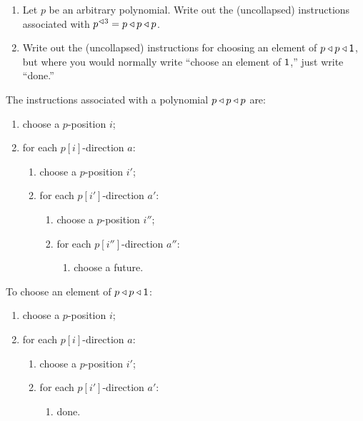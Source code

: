 \documentclass[Book-Poly]{subfiles}
\begin{document}
\begin{exercise}
\begin{enumerate}
	\item Let $p$ be an arbitrary polynomial. Write out the (uncollapsed) instructions associated with $p^{\lhd 3}=p\mathbin{\triangleleft} p\mathbin{\triangleleft} p$.
	\item Write out the (uncollapsed) instructions for choosing an element of $p\mathbin{\triangleleft} p\mathbin{\triangleleft}\textsf{1}$, but where you would normally write ``choose an element of $\textsf{1}$,'' just write ``done.'' \qedhere
\end{enumerate}
\begin{solution}
\begin{longenum}
    \item The instructions associated with a polynomial $p\mathbin{\triangleleft} p\mathbin{\triangleleft} p$ are:
    \begin{enumerate}
        \item choose a $p$-position $i$;
        \item for each $p[i]$-direction $a$:
        \begin{enumerate}[label*=\arabic*.]
            \item choose a $p$-position $i'$;
            \item for each $p[i']$-direction $a'$:
            \begin{enumerate}[label*=\arabic*.]
                \item choose a $p$-position $i''$;
                \item for each $p[i'']$-direction $a''$:
                \begin{enumerate}[label*=\arabic*.]
                    \item choose a future.
                \end{enumerate}
            \end{enumerate}
        \end{enumerate}
    \end{enumerate}
    \item To choose an element of $p\mathbin{\triangleleft} p\mathbin{\triangleleft}\textsf{1}$:
    \begin{enumerate}
        \item choose a $p$-position $i$;
        \item for each $p[i]$-direction $a$:
        \begin{enumerate}[label*=\arabic*.]
            \item choose a $p$-position $i'$;
            \item for each $p[i']$-direction $a'$:
            \begin{enumerate}[label*=\arabic*.]
                \item done.
            \end{enumerate}
        \end{enumerate}
    \end{enumerate}
\end{longenum}

\end{solution}
\end{exercise}
\end{document}
